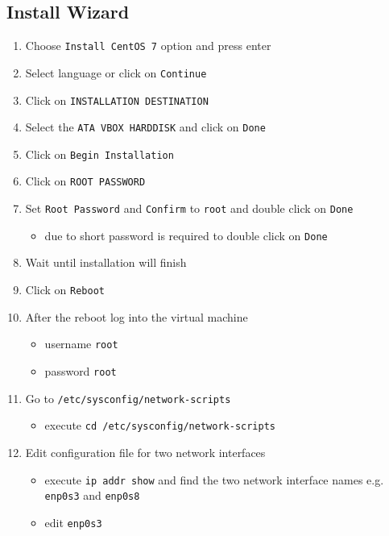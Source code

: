 \subsection{Install Wizard}\label{install-wizard}

\begin{enumerate}
\def\labelenumi{\arabic{enumi}.}
\tightlist
\item
  Choose \texttt{Install\ CentOS\ 7} option and press enter
\item
  Select language or click on \texttt{Continue}
\item
  Click on \texttt{INSTALLATION\ DESTINATION}
\item
  Select the \texttt{ATA\ VBOX\ HARDDISK} and click on \texttt{Done}
\item
  Click on \texttt{Begin\ Installation}
\item
  Click on \texttt{ROOT\ PASSWORD}
\item
  Set \texttt{Root\ Password} and \texttt{Confirm} to \texttt{root} and
  double click on \texttt{Done}

  \begin{itemize}
  \tightlist
  \item
    due to short password is required to double click on \texttt{Done}
  \end{itemize}
\item
  Wait until installation will finish
\item
  Click on \texttt{Reboot}
\item
  After the reboot log into the virtual machine

  \begin{itemize}
  \tightlist
  \item
    username \texttt{root}
  \item
    password \texttt{root}
  \end{itemize}
\item
  Go to \texttt{/etc/sysconfig/network-scripts}

  \begin{itemize}
  \tightlist
  \item
    execute \texttt{cd\ /etc/sysconfig/network-scripts}
  \end{itemize}
\item
  Edit configuration file for two network interfaces

  \begin{itemize}
  \tightlist
  \item
    execute \texttt{ip\ addr\ show} and find the two network interface
    names e.g. \texttt{enp0s3} and \texttt{enp0s8}
  \item
    edit \texttt{enp0s3}


\end{itemize}
\end{enumerate}
